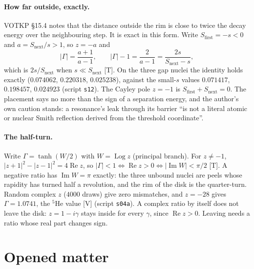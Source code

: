 \documentclass[11pt]{article}
\theoremstyle{definition}
\newcommand{\grade}[1]{\textsf{\small[#1]}}
\begin{document}
\paragraph{How far outside, exactly.} VOTKP §15.4 notes that the distance outside the rim is close to twice the decay energy over the neighbouring step. It is exact in this form. Write $S_{\mathrm{first}}=-s<0$ and $a=S_{\mathrm{next}}/s>1$, so $z=-a$ and
\[
|\Gamma|=\frac{a+1}{a-1},\qquad |\Gamma|-1=\frac{2}{a-1}=\frac{2s}{S_{\mathrm{next}}-s},
\]
which is $2s/S_{\mathrm{next}}$ when $s\ll S_{\mathrm{next}}$ \grade{T}. On the three gap nuclei the identity holds exactly ($0.074062$, $0.220318$, $0.025238$), against the small-$s$ values $0.071417$, $0.198457$, $0.024923$ (script \texttt{s12}). The Cayley pole $z=-1$ is $S_{\mathrm{first}}+S_{\mathrm{next}}=0$. The placement says no more than the sign of a separation energy, and the author's own caution stands: a resonance's leak through its barrier ``is not a literal atomic or nuclear Smith reflection derived from the threshold coordinate''.

\paragraph{The half-turn.} Write $\Gamma=\tanh(W/2)$ with $W=\operatorname{Log}z$ (principal branch). For $z\neq-1$, $|z+1|^2-|z-1|^2=4\operatorname{Re}z$, so $|\Gamma|<1\iff\operatorname{Re}z>0\iff|\operatorname{Im}W|<\pi/2$ \grade{T}. A negative ratio has $\operatorname{Im}W=\pi$ exactly: the three unbound nuclei are peels whose rapidity has turned half a revolution, and the rim of the disk is the quarter-turn. Random complex $z$ ($4000$ draws) give zero mismatches, and $z=-28$ gives $\Gamma=1.0741$, the ${}^5$He value \grade{V} (script \texttt{s04a}). A complex ratio by itself does not leave the disk: $z=1-i\gamma$ stays inside for every $\gamma$, since $\operatorname{Re}z>0$. Leaving needs a ratio whose real part changes sign.

\section{Opened matter}
\end{document}
